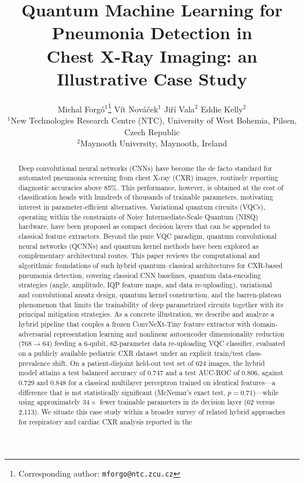 \documentclass[11pt,a4paper]{article}
\title{Quantum Machine Learning for Pneumonia Detection in\\
Chest X-Ray Imaging: an Illustrative Case Study}
\author{%
  Michal Forg\'o$^{1}$\thanks{Corresponding author:
  \texttt{mforgo@ntc.zcu.cz}}\quad
  V\'it Nov\'a\v{c}ek$^{1}$\quad
  Ji\v{r}\'i Vala$^{2}$\quad
  Eddie Kelly$^{2}$\\[7pt]
  \small $^{1}$New Technologies Research Centre (NTC),
  University of West Bohemia, Pilsen, Czech Republic\\
  \small $^{2}$Maynooth University, Maynooth, Ireland
}
\date{}
\begin{document}
\maketitle

\begin{abstract}
Deep convolutional neural networks (CNNs) have become the de facto standard
for automated pneumonia screening from chest X-ray (CXR) images, routinely
reporting diagnostic accuracies above 85\%.  This performance, however, is
obtained at the cost of classification heads with hundreds of thousands of
trainable parameters, motivating interest in parameter-efficient alternatives.
Variational quantum circuits (VQCs), operating within the constraints of Noisy
Intermediate-Scale Quantum (NISQ) hardware, have been proposed as compact
decision layers that can be appended to classical feature extractors.  Beyond
the pure VQC paradigm, quantum convolutional neural networks (QCNNs) and
quantum kernel methods have been explored as complementary architectural
routes.  This paper reviews the computational and algorithmic foundations of
such hybrid quantum--classical architectures for CXR-based pneumonia detection,
covering classical CNN baselines, quantum data-encoding strategies (angle,
amplitude, IQP feature maps, and data re-uploading), variational and
convolutional ansatz design, quantum kernel construction, and the
barren-plateau phenomenon that limits the trainability of deep parametrized
circuits together with its principal mitigation strategies.  As a concrete
illustration, we describe and analyze a hybrid pipeline that couples a frozen
ConvNeXt-Tiny feature extractor with domain-adversarial representation learning
and nonlinear autoencoder dimensionality reduction (768$\rightarrow$64) feeding
a 6-qubit, 62-parameter data re-uploading VQC classifier, evaluated on a
publicly available pediatric CXR dataset under an explicit train/test
class-prevalence shift.  On a patient-disjoint held-out test set of 624 images,
the hybrid model attains a test balanced accuracy of 0.747 and a test AUC-ROC
of 0.806, against 0.729 and 0.848 for a classical multilayer perceptron
trained on identical features---a difference that is not statistically
significant (McNemar's exact test, $p = 0.71$)---while using approximately
$34\times$ fewer trainable parameters in its decision layer (62 versus
2{,}113).  We situate this case study within a broader survey of related
hybrid approaches for respiratory and cardiac CXR analysis reported in the

\end{abstract}
\end{document}
